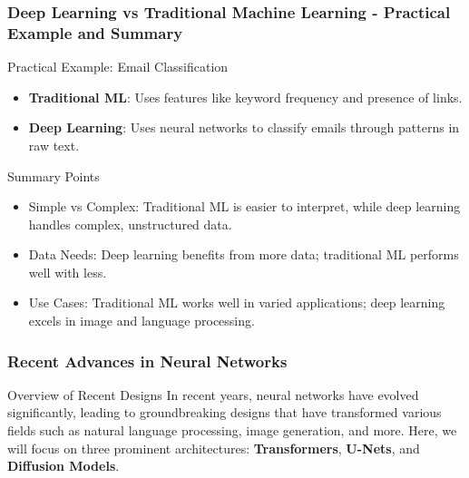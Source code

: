 \documentclass[aspectratio=169]{beamer}
\begin{document}
\begin{frame}[fragile]
    \frametitle{Deep Learning vs Traditional Machine Learning - Practical Example and Summary}
    \begin{block}{Practical Example: Email Classification}
        \begin{itemize}
            \item \textbf{Traditional ML}: Uses features like keyword frequency and presence of links.
            \item \textbf{Deep Learning}: Uses neural networks to classify emails through patterns in raw text.
        \end{itemize}
    \end{block}

    \begin{block}{Summary Points}
        \begin{itemize}
            \item Simple vs Complex: Traditional ML is easier to interpret, while deep learning handles complex, unstructured data.
            \item Data Needs: Deep learning benefits from more data; traditional ML performs well with less.
            \item Use Cases: Traditional ML works well in varied applications; deep learning excels in image and language processing.
        \end{itemize}
    \end{block}
\end{frame}

\begin{frame}[fragile]
    \frametitle{Recent Advances in Neural Networks}
    
    \begin{block}{Overview of Recent Designs}
        In recent years, neural networks have evolved significantly, leading to groundbreaking designs that have transformed various fields such as natural language processing, image generation, and more. Here, we will focus on three prominent architectures: 
        \textbf{Transformers}, \textbf{U-Nets}, and \textbf{Diffusion Models}.
    \end{block}
\end{frame}
\end{document}

